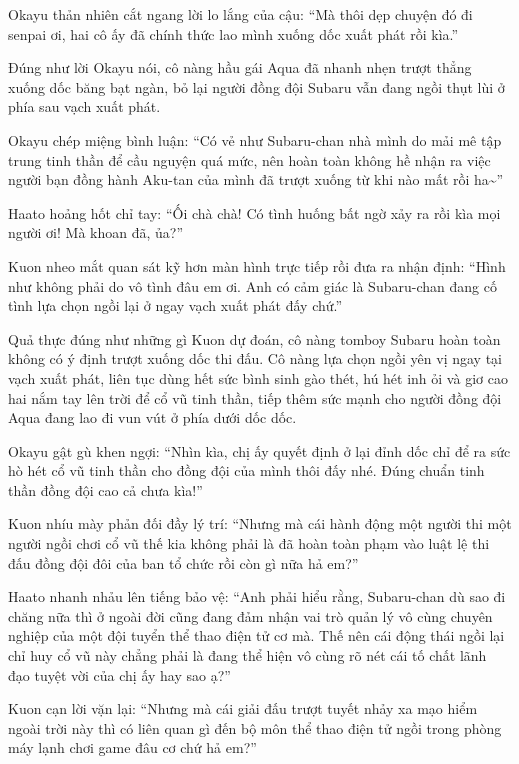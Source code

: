 \documentclass[../main.tex]{subfiles}
\begin{document}
Okayu thản nhiên cắt ngang lời lo lắng của cậu: ``Mà thôi dẹp chuyện đó đi senpai ơi, hai cô ấy đã chính thức lao mình xuống dốc xuất phát rồi kìa.''

Đúng như lời Okayu nói, cô nàng hầu gái Aqua đã nhanh nhẹn trượt thẳng xuống dốc băng bạt ngàn, bỏ lại người đồng đội Subaru vẫn đang ngồi thụt lùi ở phía sau vạch xuất phát.


Okayu chép miệng bình luận: ``Có vẻ như Subaru-chan nhà mình do mải mê tập trung tinh thần để cầu nguyện quá mức, nên hoàn toàn không hề nhận ra việc người bạn đồng hành Aku-tan của mình đã trượt xuống từ khi nào mất rồi ha\~{}''

Haato hoảng hốt chỉ tay: ``Ối chà chà! Có tình huống bất ngờ xảy ra rồi kìa mọi người ơi! Mà khoan đã, ủa?''

Kuon nheo mắt quan sát kỹ hơn màn hình trực tiếp rồi đưa ra nhận định: ``Hình như không phải do vô tình đâu em ơi. Anh có cảm giác là Subaru-chan đang cố tình lựa chọn ngồi lại ở ngay vạch xuất phát đấy chứ.''

Quả thực đúng như những gì Kuon dự đoán, cô nàng tomboy Subaru hoàn toàn không có ý định trượt xuống dốc thi đấu. Cô nàng lựa chọn ngồi yên vị ngay tại vạch xuất phát, liên tục dùng hết sức bình sinh gào thét, hú hét inh ỏi và giơ cao hai nắm tay lên trời để cổ vũ tinh thần, tiếp thêm sức mạnh cho người đồng đội Aqua đang lao đi vun vút ở phía dưới dốc dốc.


Okayu gật gù khen ngợi: ``Nhìn kìa, chị ấy quyết định ở lại đỉnh dốc chỉ để ra sức hò hét cổ vũ tinh thần cho đồng đội của mình thôi đấy nhé. Đúng chuẩn tinh thần đồng đội cao cả chưa kìa!''

Kuon nhíu mày phản đối đầy lý trí: ``Nhưng mà cái hành động một người thi một người ngồi chơi cổ vũ thế kia không phải là đã hoàn toàn phạm vào luật lệ thi đấu đồng đội đôi của ban tổ chức rồi còn gì nữa hả em?''

Haato nhanh nhảu lên tiếng bảo vệ: ``Anh phải hiểu rằng, Subaru-chan dù sao đi chăng nữa thì ở ngoài đời cũng đang đảm nhận vai trò quản lý vô cùng chuyên nghiệp của một đội tuyển thể thao điện tử cơ mà. Thế nên cái động thái ngồi lại chỉ huy cổ vũ này chẳng phải là đang thể hiện vô cùng rõ nét cái tố chất lãnh đạo tuyệt vời của chị ấy hay sao ạ?''

Kuon cạn lời vặn lại: ``Nhưng mà cái giải đấu trượt tuyết nhảy xa mạo hiểm ngoài trời này thì có liên quan gì đến bộ môn thể thao điện tử ngồi trong phòng máy lạnh chơi game đâu cơ chứ hả em?''
\end{document}
